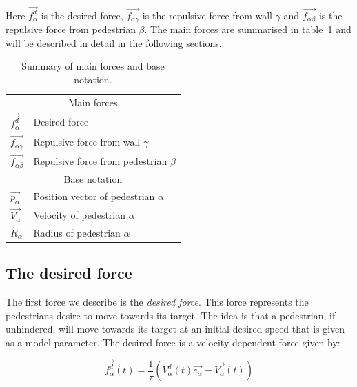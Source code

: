 Here $\overrightarrow{f_{\alpha}^{d}}$ is the desired force, 
$\overrightarrow{f_{\alpha \gamma}}$ is the repulsive force from wall $\gamma$ 
and $\overrightarrow{f_{\alpha \beta}}$ is the repulsive force from pedestrian 
$\beta$. The main forces are summarised in table~\ref{tbl:main-forces} and 
will be described in detail in the following sections.

\begin{table}[h]
    \centering
    \begin{tabular}{l l}
        \toprule
        \multicolumn{2}{c}{\textsf{Main forces}}\\
        $\overrightarrow{f_{\alpha}^{d}}$ & Desired force\\
        $\overrightarrow{f_{\alpha \gamma}}$ & Repulsive force from wall 
        $\gamma$\\
        $\overrightarrow{f_{\alpha \beta}}$ & Repulsive force from pedestrian 
        $\beta$\\
        \midrule
        \multicolumn{2}{c}{\textsf{Base notation}}\\
        $\overrightarrow{p_{\alpha}}$ & Position vector of pedestrian 
        $\alpha$\\
        $\overrightarrow{V_{\alpha}}$ & Velocity of pedestrian $\alpha$\\
        $R_\alpha$ & Radius of pedestrian $\alpha$\\
        \bottomrule
    \end{tabular}
    \caption{Summary of main forces and base notation.}
    \label{tbl:main-forces}
\end{table}

\subsection{The desired force}
\label{sec:desired-force}
The first force we describe is the \emph{desired force}. This force represents 
the pedestrians desire to move towards its target. The idea is that a 
pedestrian, if unhindered, will move towards its target at an initial desired 
speed that is given as a model parameter. The desired force is a velocity 
dependent force given by:

\begin{equation}\label{eqn:desired-force}
	\overrightarrow{f^{d}_{\alpha}} (t) =
    \frac{1}{\tau}
    \left( V_{\alpha}^{d}(t) \overrightarrow{e_{\alpha}} - 
    \overrightarrow{V_{\alpha}}(t) \right)
\end{equation}

